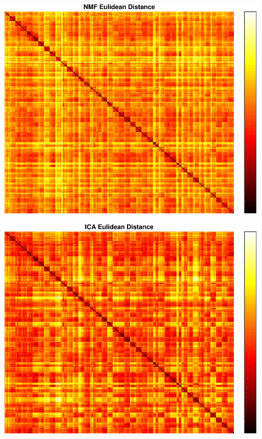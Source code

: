 \begin{center}
\begin{minipage}[t]{\linewidth}
\center
{
\includegraphics[width=\MyFactor\textwidth]{Img/nmfeu} 
}
\end{minipage}
\medskip
\end{center}

\begin{center}
\begin{minipage}[t]{\linewidth}
\center
{
\includegraphics[width=\MyFactor\textwidth]{Img/icaeu} 
}
\end{minipage}
\medskip
\end{center}


